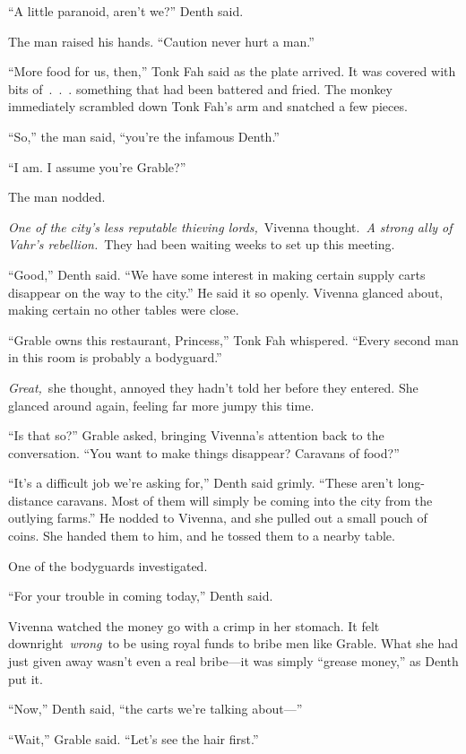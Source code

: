 “A little paranoid, aren’t we?” Denth said.

The man raised his hands. “Caution never hurt a man.”

“More food for us, then,” Tonk Fah said as the plate arrived. It was covered with bits of~.~.~. something that had been battered and fried. The monkey immediately scrambled down Tonk Fah’s arm and snatched a few pieces.

“So,” the man said, “you’re the infamous Denth.”

“I am. I assume you’re Grable?”

The man nodded.

\textit{One of the city’s less reputable thieving lords,}~Vivenna thought.~\textit{A strong ally of Vahr’s rebellion.}~They had been waiting weeks to set up this meeting.

“Good,” Denth said. “We have some interest in making certain supply carts disappear on the way to the city.” He said it so openly. Vivenna glanced about, making certain no other tables were close.

“Grable owns this restaurant, Princess,” Tonk Fah whispered. “Every second man in this room is probably a bodyguard.”

\textit{Great,}~she thought, annoyed they hadn’t told her before they entered. She glanced around again, feeling far more jumpy this time.

“Is that so?” Grable asked, bringing Vivenna’s attention back to the conversation. “You want to make things disappear? Caravans of food?”

“It’s a difficult job we’re asking for,” Denth said grimly. “These aren’t long-distance caravans. Most of them will simply be coming into the city from the outlying farms.” He nodded to Vivenna, and she pulled out a small pouch of coins. She handed them to him, and he tossed them to a nearby table.

One of the bodyguards investigated.

“For your trouble in coming today,” Denth said.

Vivenna watched the money go with a crimp in her stomach. It felt downright~\textit{wrong}~to be using royal funds to bribe men like Grable. What she had just given away wasn’t even a real bribe—it was simply “grease money,” as Denth put it.

“Now,” Denth said, “the carts we’re talking about—”

“Wait,” Grable said. “Let’s see the hair first.”

